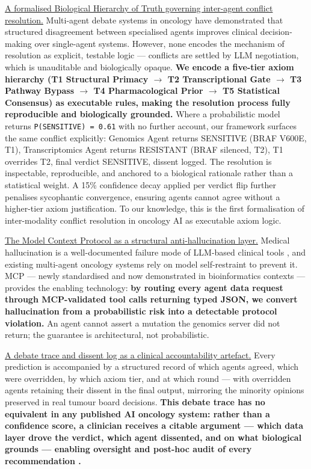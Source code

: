 \documentclass[12pt, letterpaper]{article}
\begin{document}
\uline{A formalised Biological Hierarchy of Truth governing inter-agent conflict resolution.}
Multi-agent debate systems in oncology \cite{evomdt2026, han2024consensus} have demonstrated that
structured disagreement between specialised agents improves clinical decision-making over
single-agent systems. However, none encodes the mechanism of resolution as explicit, testable
logic --- conflicts are settled by LLM negotiation, which is unauditable and biologically
opaque. \textbf{We encode a five-tier axiom hierarchy (T1 Structural Primacy $\to$ T2
Transcriptional Gate $\to$ T3 Pathway Bypass $\to$ T4 Pharmacological Prior $\to$ T5
Statistical Consensus) as executable rules, making the resolution process fully reproducible
and biologically grounded.} Where a probabilistic model returns \texttt{P(SENSITIVE) = 0.61} with no further account,
our framework surfaces the same conflict explicitly: Genomics Agent returns SENSITIVE (BRAF
V600E, T1), Transcriptomics Agent returns RESISTANT (BRAF silenced, T2), T1 overrides T2,
final verdict SENSITIVE, dissent logged. The resolution is inspectable, reproducible, and anchored to a biological rationale rather
than a statistical weight. A 15\% confidence decay applied per verdict flip further penalises
sycophantic convergence, ensuring agents cannot agree without a higher-tier axiom justification.
To our knowledge, this is the first formalisation of inter-modality conflict resolution in
oncology AI as executable axiom logic.

\uline{The Model Context Protocol as a structural anti-hallucination layer.}
Medical hallucination is a well-documented failure mode of LLM-based clinical tools
\cite{kim2025hallucination, nishisako2025hallucination}, and existing multi-agent oncology
systems rely on model self-restraint to prevent it. MCP --- newly standardised and now
demonstrated in bioinformatics contexts \cite{flotho2026mcpmed, widjaja2025bioinformcp} ---
provides the enabling technology: \textbf{by routing every agent data request through
MCP-validated tool calls returning typed JSON, we convert hallucination from a probabilistic
risk into a detectable protocol violation.} An agent cannot assert a mutation the genomics
server did not return; the guarantee is architectural, not probabilistic.

\uline{A debate trace and dissent log as a clinical accountability artefact.}
Every prediction is accompanied by a structured record of which agents agreed, which were
overridden, by which axiom tier, and at which round --- with overridden agents retaining their
dissent in the final output, mirroring the minority opinions preserved in real tumour board
decisions. \textbf{This debate trace has no equivalent in any published AI oncology system:
rather than a confidence score, a clinician receives a citable argument --- which data layer
drove the verdict, which agent dissented, and on what biological grounds --- enabling oversight
and post-hoc audit of every recommendation \cite{evomdt2026, lorenzo2026oncotimia}.}
\end{document}
